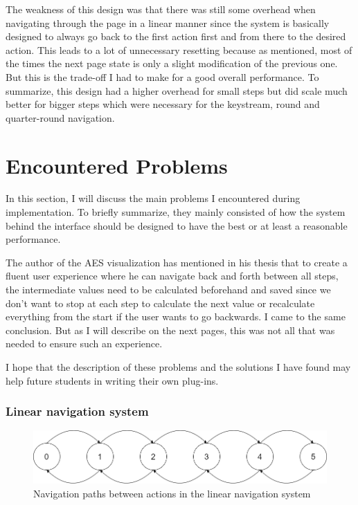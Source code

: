 The weakness of this design was that there was still some overhead when navigating through the page in a linear manner since the system is basically designed to always go back to the first action first and from there to the desired action. This leads to a lot of unnecessary resetting because as mentioned, most of the times the next page state is only a slight modification of the previous one. But this is the trade-off I had to make for a good overall performance. To summarize, this design had a higher overhead for small steps but did scale much better for bigger steps which were necessary for the keystream, round and quarter-round navigation.


\section{Encountered Problems}
\label{sec:encounteredProblems}

In this section, I will discuss the main problems I encountered during implementation. To briefly summarize, they mainly consisted of how the system behind the interface should be designed to have the best or at least a reasonable performance.

The author of the AES visualization has mentioned in his thesis that to create a fluent user experience where he can navigate back and forth between all steps, the intermediate values need to be calculated beforehand and saved since we don't want to stop at each step to calculate the next value or recalculate everything from the start if the user wants to go backwards. I came to the same conclusion. But as I will describe on the next pages, this was not all that was needed to ensure such an experience.

I hope that the description of these problems and the solutions I have found may help future students in writing their own plug-ins.

\subsubsection{Linear navigation system}

\begin{figure}
\centering
\includegraphics[width=\textwidth]{figures/navigationsystem-diagram/navigationsystem-linear-overview.png}
\caption[Navigation paths in linear navigation system]{Navigation paths between actions in the linear navigation system}
\label{fig:navsystem.linear.overview}
\end{figure}

